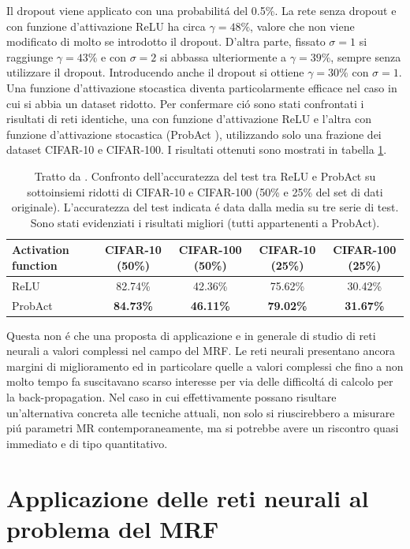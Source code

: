 \documentclass[a4paper,12pt]{report}
\begin{document}
  
  Il dropout viene applicato con una probabilit\'a del 0.5\%. La rete senza dropout e con funzione d'attivazione ReLU ha circa $\gamma = 48\%$, valore che non viene modificato di molto se introdotto il dropout. D'altra parte, fissato $\sigma = 1$ si raggiunge $\gamma = 43\%$ e con $\sigma = 2$ si abbassa ulteriormente a $\gamma = 39\%$, sempre senza utilizzare il dropout. Introducendo anche il dropout si ottiene $\gamma = 30\%$ con $\sigma = 1$.
  Una funzione d'attivazione stocastica diventa particolarmente efficace nel caso in cui si abbia un dataset ridotto. Per confermare ci\'o sono stati confrontati i risultati di reti identiche, una con funzione d'attivazione ReLU e l'altra con funzione d'attivazione stocastica (ProbAct \cite{lee2019probact}), utilizzando solo una frazione dei dataset CIFAR-10 e CIFAR-100. I risultati ottenuti sono mostrati in tabella \ref{PartialDatasetTab}.
  \begin{table}[h]\caption{Tratto da \cite{lee2019probact}. Confronto dell'accuratezza del test tra ReLU e ProbAct su sottoinsiemi ridotti di CIFAR-10 e CIFAR-100 (50\% e 25\% del set di dati originale). L'accuratezza del test indicata \'e data dalla media su tre serie di test. Sono stati evidenziati i risultati migliori (tutti appartenenti a ProbAct).} \label{PartialDatasetTab}
   \centering
   \begin{tabular}[h]{|l|c|c|c|c|}
    \hline
    Activation function & CIFAR-10 (50\%) & CIFAR-100 (50\%) & CIFAR-10 (25\%) & CIFAR-100 (25\%) \\ \hline
    ReLU & 82.74\% & 42.36\% & 75.62\% & 30.42\% \\ 
    ProbAct & \textbf{84.73\%} & \textbf{46.11\%} & \textbf{79.02\%} & \textbf{31.67\%} \\ \hline
   \end{tabular}
  \end{table}
 
  
 Questa non \'e che una proposta di applicazione e in generale di studio di reti neurali a valori complessi nel campo del MRF. Le reti neurali presentano ancora margini di miglioramento ed in particolare quelle a valori complessi che fino a non molto tempo fa suscitavano scarso interesse per via delle difficolt\'a di calcolo per la back-propagation. Nel caso in cui effettivamente possano risultare un'alternativa concreta alle tecniche attuali, non solo si riuscirebbero a misurare pi\'u parametri MR contemporaneamente, ma si potrebbe avere un riscontro quasi immediato e di tipo quantitativo.
 
 
 \chapter*{Applicazione delle reti neurali al problema del MRF}\label{MRIsection}
 
\end{document}
